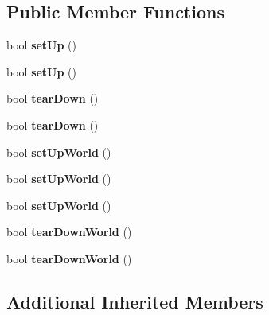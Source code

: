 \subsection*{Public Member Functions}
\begin{DoxyCompactItemize}
\item 
\hypertarget{classFixture_ab00b62453dafa5413184465540e5b486}{bool {\bfseries set\-Up} ()}\label{classFixture_ab00b62453dafa5413184465540e5b486}

\item 
\hypertarget{classFixture_ab00b62453dafa5413184465540e5b486}{bool {\bfseries set\-Up} ()}\label{classFixture_ab00b62453dafa5413184465540e5b486}

\item 
\hypertarget{classFixture_ab4273c31d68cd95fff8e9416236d035f}{bool {\bfseries tear\-Down} ()}\label{classFixture_ab4273c31d68cd95fff8e9416236d035f}

\item 
\hypertarget{classFixture_ab4273c31d68cd95fff8e9416236d035f}{bool {\bfseries tear\-Down} ()}\label{classFixture_ab4273c31d68cd95fff8e9416236d035f}

\item 
\hypertarget{classFixture_a72678873ab3c26077b70787d02a99497}{bool {\bfseries set\-Up\-World} ()}\label{classFixture_a72678873ab3c26077b70787d02a99497}

\item 
\hypertarget{classFixture_a72678873ab3c26077b70787d02a99497}{bool {\bfseries set\-Up\-World} ()}\label{classFixture_a72678873ab3c26077b70787d02a99497}

\item 
\hypertarget{classFixture_a72678873ab3c26077b70787d02a99497}{bool {\bfseries set\-Up\-World} ()}\label{classFixture_a72678873ab3c26077b70787d02a99497}

\item 
\hypertarget{classFixture_afededb083a7205269642ae3939d0faf3}{bool {\bfseries tear\-Down\-World} ()}\label{classFixture_afededb083a7205269642ae3939d0faf3}

\item 
\hypertarget{classFixture_afededb083a7205269642ae3939d0faf3}{bool {\bfseries tear\-Down\-World} ()}\label{classFixture_afededb083a7205269642ae3939d0faf3}

\end{DoxyCompactItemize}
\subsection*{Additional Inherited Members}


